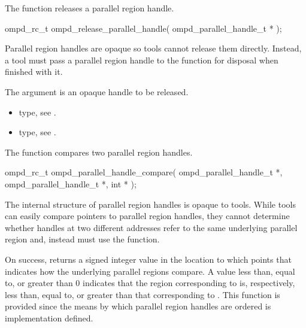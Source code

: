 \label{subsubsubsec:ompd_release_parallel_handle}
\summary
The  function releases a parallel region handle.

\format
\begin{cspecific}
\begin{ompSyntax}
ompd_rc_t ompd_release_parallel_handle(
  ompd_parallel_handle_t *
);
\end{ompSyntax}
\end{cspecific}

\descr
Parallel region handles are opaque so tools cannot release them directly. 
Instead, a tool must pass a parallel region handle to the 
 function for disposal when finished with it.

\argdesc
The  argument is an opaque handle to be released.

\crossreferences
\begin{itemize}
\item {} type, 
see .

\item {} type, see .
\end{itemize}



\label{subsubsubsec:ompd_parallel_handle_compare}

\summary
The  function compares two parallel 
region handles.

\format
\begin{cspecific}
\begin{ompSyntax}
ompd_rc_t ompd_parallel_handle_compare(
  ompd_parallel_handle_t *,
  ompd_parallel_handle_t *,
  int *
);
\end{ompSyntax}
\end{cspecific}

\descr
The internal structure of parallel region handles is opaque to tools. While 
tools can easily compare pointers to parallel region handles, they cannot 
determine whether handles at two different addresses refer to the same 
underlying parallel region and, instead must use the 
 function.

On success,  returns a signed integer value 
in the location to which  points that indicates how the underlying 
parallel regions compare. A value less than, equal to, or greater than 0 indicates
that the region corresponding to  is, respectively, less 
than, equal to, or greater than that corresponding to .
This function is provided since the means by which parallel region handles are 
ordered is implementation defined.

